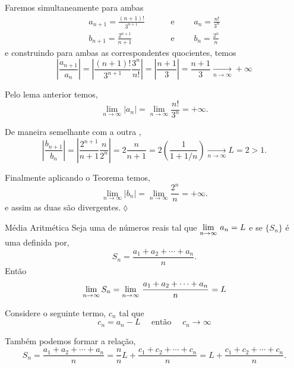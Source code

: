 \solo Faremos simultaneamente para ambas \seqs
\begin{align*}
a_{n+1}=\frac{(n+1)!}{3^{n+1}}&\qquad \text{ e }\qquad a_{n}=\frac{n!}{3^{n}}\\[2ex]
b_{n+1}=\frac{2^{n+1}}{n+1}&\qquad \text{ e }\qquad
b_{n}=\frac{2^n}{n}
\end{align*}
e construindo para ambas \seqs as correspondentes quocientes, temos
\begin{equation*}
    \left|\dfrac{a_{n+1}}{a_n}\right|=\left|
    \dfrac{(n+1)!}{3^{n+1}}\dfrac{3^n}{n!}\right|=\left|\dfrac{n+1}{3}
    \right|=\frac{n+1}{3}\xrightarrow[n\to\infty]{}+\infty
\end{equation*}

Pelo lema anterior temos,
\begin{equation*}
    \lim_{n\to\infty}|a_n|=\lim_{n\to\infty}\dfrac{n!}{3^n}=+\infty.
\end{equation*}

De maneira semelhante com a outra \seq,
\begin{equation*}
    \left|\frac{b_{n+1}}{b_n} \right|= \left|\frac{2^{n+1}}{n+1}\frac{n}{2^n}
    \right|=2\frac{n}{n+1}=2\left(\frac{1}{1+1/n}
    \right)\xrightarrow[n\to\infty]{}L=2>1.
\end{equation*}

Finalmente aplicando o Teorema temos,
\begin{equation*}
 \lim_{n\to\infty}|b_n|=\lim_{n\to\infty}\frac{2^n}{n}=+\infty.
\end{equation*}
e assim as duas \seqs s\~{a}o divergentes.\hfill \(\lozenge\)

\begin{theoc}{M\'{e}dia Aritm\'{e}tica}{}
Seja   uma \seq de n\'{u}meros reais tal que
$\displaystyle{\lim_{n\to \infty}\,{a}_{n}}=L$ e se $\{S_n\}$ \'{e} uma \seq definida por,
\begin{equation*}
    S_n=\frac{a_1+a_2+\cdots+a_n}{n}.
\end{equation*}
Ent\~{a}o
\begin{equation*}
  \lim_{n\to\infty}S_n=\displaystyle{\lim_{n\to \infty}\,{\frac{a_1+a_2+\cdots+a_n}{n}}_{}}=L
\end{equation*}
\end{theoc}

\prova Considere o seguinte termo, $c_n$ tal que
\begin{equation*}
    c_n=a_n-L\quad \text{ ent\~{a}o }\quad c_n\to \infty
\end{equation*}

Tamb\'{e}m podemos formar a rela\c{c}\~{a}o,
\begin{equation*}
    S_n=\frac{a_1+a_2+\cdots+a_n}{n}=\frac{n}{n}L+\frac{c_1+c_2+\cdots+c_n}{n}=
    L+\frac{c_1+c_2+\cdots+c_n}{n}.
\end{equation*}

